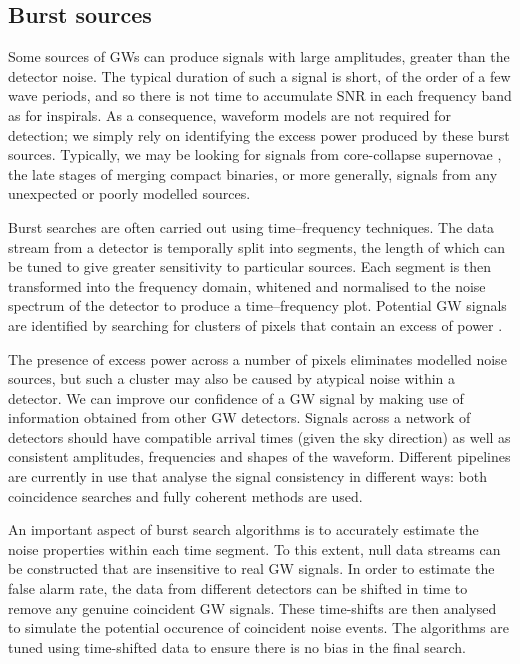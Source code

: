 \subsection{Burst sources}\label{sec:bursts}

Some sources of GWs can produce signals with large amplitudes, greater than the detector noise. The typical duration of such a signal is short, of the order of a few wave periods, and so there is not time to accumulate SNR in each frequency band as for inspirals. As a consequence, waveform models are not required for detection; we simply rely on identifying the excess power produced by these burst sources. Typically, we may be looking for signals from core-collapse supernovae \citep{Ott2009}, the late stages of merging compact binaries, or more generally, signals from any unexpected or poorly modelled sources.

Burst searches are often carried out using time--frequency techniques. The data stream from a detector is temporally split into segments, the length of which can be tuned to give greater sensitivity to particular sources. Each segment is then transformed into the frequency domain, whitened and normalised to the noise spectrum of the detector to produce a time--frequency plot. Potential GW signals are identified by searching for clusters of pixels that contain an excess of power \citep[e.g.,][]{Bursts}.

The presence of excess power across a number of pixels eliminates modelled noise sources, but such a cluster may also be caused by atypical noise within a detector. We can improve our confidence of a GW signal by making use of information obtained from other GW detectors. Signals across a network of detectors should have compatible arrival times (given the sky direction) as well as consistent amplitudes, frequencies and shapes of the waveform. Different pipelines are currently in use that analyse the signal consistency in different ways: both coincidence searches \citep{Chatterji2004} and fully coherent methods \citep{Klimenko2008} are used.

 An important aspect of burst search algorithms is to accurately estimate the noise properties within each time segment. To this extent, null data streams can be constructed that are insensitive to real GW signals. In order to estimate the false alarm rate, the data from different detectors can be shifted in time to remove any genuine coincident GW signals. These time-shifts are then analysed to simulate the potential occurence of coincident noise events. The algorithms are tuned using time-shifted data to ensure there is no bias in the final search.


